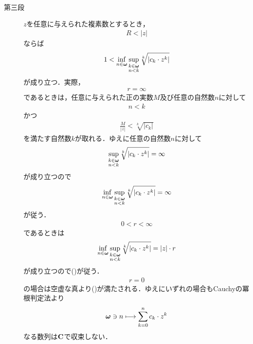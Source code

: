 \begin{sketch}
\begin{description}
			\item[第三段]
				$z$を任意に与えられた複素数とするとき，
				\begin{align}
					R < |z|
				\end{align}
				ならば
				\begin{align}
					1 < \operatorname*{inf}_{n \in {\boldsymbol \omega}} \operatorname*{sup}_{\substack{k \in {\boldsymbol \omega} \\ n < k}} \sqrt[k]{|c_{k} \cdot z^{k}|}
					\label{fom:thm_radius_of_convergence_2}
				\end{align}
				が成り立つ．実際，
				\begin{align}
					r = \infty
				\end{align}
				であるときは，任意に与えられた正の実数$M$及び任意の自然数$n$に対して
				\begin{align}
					n < k
				\end{align}
				かつ
				\begin{align}
					\frac{M}{|z|} < \sqrt[k]{|c_{k}|}
				\end{align}
				を満たす自然数$k$が取れる．ゆえに任意の自然数$n$に対して
				\begin{align}
					\operatorname*{sup}_{\substack{k \in {\boldsymbol \omega} \\ n < k}} \sqrt[k]{|c_{k} \cdot z^{k}|} = \infty
				\end{align}
				が成り立つので
				\begin{align}
					\operatorname*{inf}_{n \in {\boldsymbol \omega}} \operatorname*{sup}_{\substack{k \in {\boldsymbol \omega} \\ n < k}} \sqrt[k]{|c_{k} \cdot z^{k}|}
					= \infty
				\end{align}
				が従う．
				\begin{align}
					0 < r < \infty
				\end{align}
				であるときは
				\begin{align}
					\operatorname*{inf}_{n \in {\boldsymbol \omega}} \operatorname*{sup}_{\substack{k \in {\boldsymbol \omega} \\ n < k}} \sqrt[k]{|c_{k} \cdot z^{k}|}
					= |z| \cdot r
				\end{align}
				が成り立つので()が従う．
				\begin{align}
					r = 0
				\end{align}
				の場合は空虚な真より()が満たされる．ゆえにいずれの場合もCauchyの冪根判定法より
				\begin{align}
					{\boldsymbol \omega} \ni n \longmapsto \sum_{k=0}^{n} c_{k} \cdot z^{k}
				\end{align}
				なる数列は$\mathbf{C}$で収束しない．
				\QED
		\end{description}
	\end{sketch}
	
